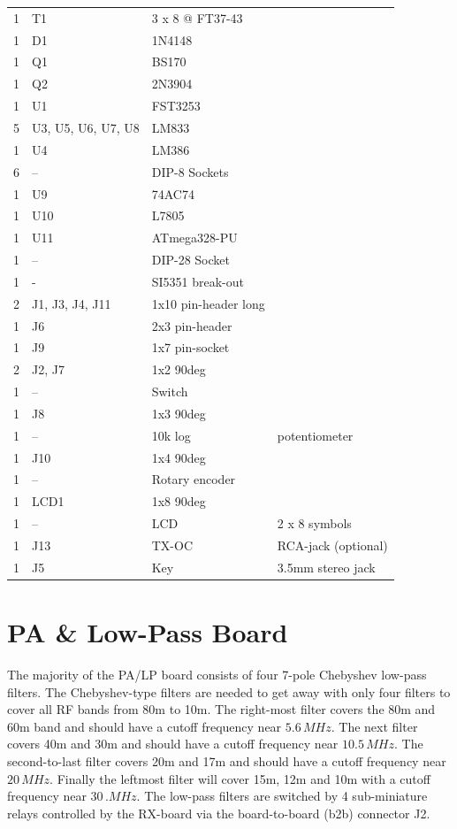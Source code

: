 \documentclass[10pt, a4paper,twoside,openright]{scrartcl}
\begin{document}
\begin{longtable}{|l|p{6cm}|l|l|}
1 & T1 & 3 x 8 @ FT37-43 & \\
1 & D1 & 1N4148 & \\
1 & Q1 & BS170 & \\
1 & Q2 & 2N3904 & \\
1 & U1 & FST3253 & \\
5 & U3, U5, U6, U7, U8 & LM833 & \\
1 & U4 & LM386 & \\ 
6 & -- & DIP-8 Sockets & \\
1 & U9 & 74AC74 & \\
1 & U10 & L7805 & \\
1 & U11 & ATmega328-PU & \\
1 & --  & DIP-28 Socket & \\
1 & - & SI5351 break-out & \\
2 & J1, J3, J4, J11 & 1x10 pin-header long & \\
1 & J6 & 2x3 pin-header & \\
1 & J9 & 1x7 pin-socket & \\
2 & J2, J7 & 1x2 90deg & \\
1 & -- & Switch & \\
1 & J8 & 1x3 90deg & \\
1 & -- & 10k log & potentiometer \\
1 & J10 & 1x4 90deg & \\
1 & -- & Rotary encoder & \\
1 & LCD1 & 1x8 90deg & \\
1 & -- & LCD & 2 x 8 symbols \\
1 & J13 & TX-OC & RCA-jack (optional) \\
1 & J5 & Key & 3.5mm stereo jack\\ \hline
\end{longtable}

\cleardoublepage
\section{PA \& Low-Pass Board} \label{sec:pa}
The majority of the PA/LP board consists of four 7-pole Chebyshev low-pass filters. The Chebyshev-type filters are needed to get away with only four filters to cover all RF bands from 80m to 10m. The right-most filter covers the 80m and 60m band and should have a cutoff frequency near $5.6\,MHz$. The next filter covers 40m and 30m and should have a cutoff frequency near $10.5\,MHz$. The second-to-last filter covers 20m and 17m and should have a cutoff frequency near $20\,MHz$. Finally the leftmost filter will cover 15m, 12m and 10m with a cutoff frequency near $30\,.MHz$. The low-pass filters are switched by 4 sub-miniature relays controlled by the RX-board via the board-to-board (b2b) connector J2.
\end{document}
